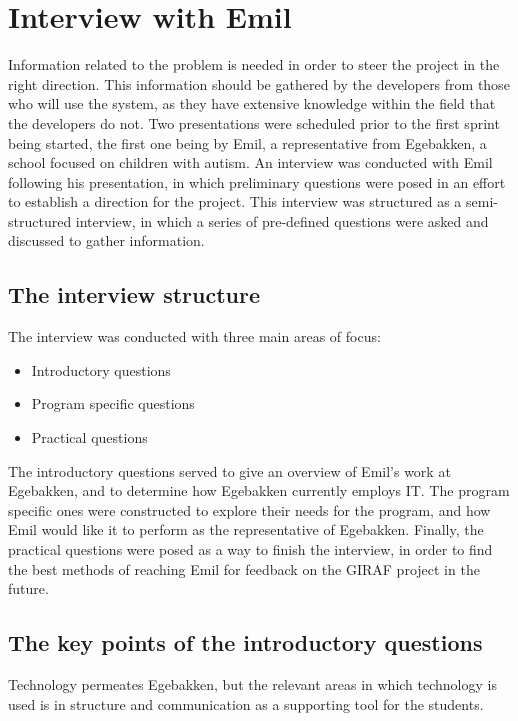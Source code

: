 \section{Interview with Emil}\label{interview-with-emil}
Information related to the problem is needed in order to steer the project in the right direction.
This information should be gathered by the developers from those who will use the system, as they have extensive knowledge within the field that the developers do not.
Two presentations were scheduled prior to the first sprint being started, the first one being by Emil, a representative from Egebakken, a school focused on children with autism.
An interview was conducted with Emil following his presentation, in which preliminary questions were posed in an effort to establish a direction for the project.
This interview was structured as a semi-structured interview, in which a series of pre-defined questions were asked and discussed to gather information.

\subsection{The interview structure}
The interview was conducted with three main areas of focus:
\begin{itemize}
    \item Introductory questions
    \item Program specific questions
    \item Practical questions
\end{itemize}
\noindent
The introductory questions served to give an overview of Emil's work at Egebakken, and to determine how Egebakken currently employs IT.
The program specific ones were constructed to explore their needs for the program, and how Emil would like it to perform as the representative of Egebakken.
Finally, the practical questions were posed as a way to finish the interview, in order to find the best methods of reaching Emil for feedback on the GIRAF project in the future.

\subsection{The key points of the introductory questions}
Technology permeates Egebakken, but the relevant areas in which technology is used is in structure and communication as a supporting tool for the students.

